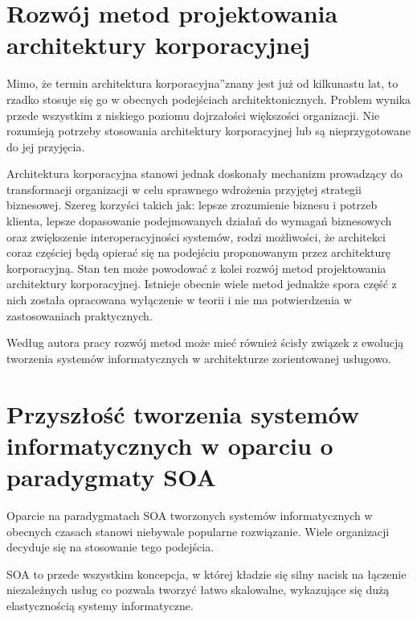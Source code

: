 \section{Rozwój metod projektowania architektury korporacyjnej}
Mimo, że termin \quotedblbase architektura korporacyjna\textquotedblright znany jest już od kilkunastu lat, to rzadko stosuje się go w obecnych podejściach architektonicznych. Problem wynika przede wszystkim z niskiego poziomu dojrzałości większości organizacji.  Nie rozumieją potrzeby stosowania architektury korporacyjnej lub są nieprzygotowane do jej przyjęcia. \cite{SobArchKorpProg}

Architektura korporacyjna stanowi jednak doskonały mechanizm prowadzący do transformacji organizacji w celu sprawnego wdrożenia przyjętej strategii biznesowej. Szereg korzyści takich jak: lepsze zrozumienie biznesu i potrzeb klienta, lepsze dopasowanie podejmowanych działań do wymagań biznesowych oraz zwiększenie interoperacyjności systemów, rodzi możliwości, że architekci coraz częściej będą opierać się na podejściu proponowanym przez architekturę korporacyjną. \cite{ArchKorpAdmPub} Stan ten może powodować z kolei rozwój metod projektowania architektury korporacyjnej. Istnieje obecnie wiele metod jednakże spora część z nich została opracowana wyłączenie w teorii i nie ma potwierdzenia w zastosowaniach praktycznych.

Według autora pracy rozwój metod może mieć również ścisły związek z ewolucją tworzenia systemów informatycznych w architekturze zorientowanej usługowo.

\section{Przyszłość tworzenia systemów informatycznych w oparciu o paradygmaty SOA}
Oparcie na paradygmatach SOA tworzonych systemów informatycznych w obecnych czasach stanowi niebywale popularne rozwiązanie. Wiele organizacji decyduje się na stosowanie tego podejścia.

SOA to przede wszystkim koncepcja, w której kładzie się silny nacisk na łączenie niezależnych usług co pozwala tworzyć łatwo skalowalne, wykazujące się dużą elastycznością systemy informatyczne. 